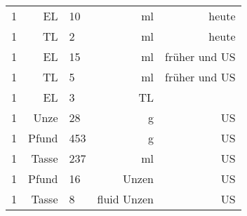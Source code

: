 \begin{tabularx}{\linewidth}{lr|lr|r}
  1 & EL    &  10 & ml          &         heute \\
  1 & TL    &   2 & ml          &         heute \\
  1 & EL    &  15 & ml          & früher und US \\
  1 & TL    &   5 & ml          & früher und US \\
  1 & EL    &   3 & TL          &               \\
  1 & Unze  &  28 & g           &            US \\
  1 & Pfund & 453 & g           &            US \\
  1 & Tasse & 237 & ml          &            US \\
  1 & Pfund &  16 & Unzen       &            US \\
  1 & Tasse &   8 & fluid Unzen &            US \\
\end{tabularx}

